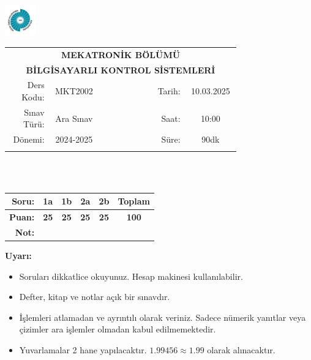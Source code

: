 \newcommand\UniversiteAdi{Niğde Ömer Halisdemir Üniversitesi}
\newcommand\BolumAdi{MEKATRONİK BÖLÜMÜ}
\newcommand\DersKodu{MKT2002}
\newcommand\DersAdi{BİLGİSAYARLI KONTROL SİSTEMLERİ}
\newcommand\SinavAdi{Ara Sınav}
\newcommand\SinavTarihi{10.03.2025}
\newcommand\SinavSaati{10:00}
\newcommand\SinavSuresi{90dk}

\pagestyle{fancy}
\fancyhf{} %
\noindent \includegraphics[width=0.1\textwidth]{logo}
\begin{tabular}{
    p{0.15\linewidth}
    p{0.15\linewidth}
    p{0.2\linewidth}
    p{0.1\linewidth}
    p{0.15\linewidth}}
    \multicolumn{5}{c}{\textbf{\BolumAdi}}\\
    \multicolumn{5}{c}{\textbf{\DersAdi}}\\\hline
    \multicolumn{1}{|r|}{Ders Kodu:}&
    \multicolumn{1}{|c|}{\DersKodu}&
    \multicolumn{1}{|c|}{}& 
    \multicolumn{1}{|r|}{Tarih:}&
    \multicolumn{1}{|c|}{\SinavTarihi} \\\hline
    \multicolumn{1}{|r|}{Sınav Türü:}&
    \multicolumn{1}{|c|}{\SinavAdi}&  
    \multicolumn{1}{|c|}{}&
    \multicolumn{1}{|r|}{Saat:}&
    \multicolumn{1}{|c|}{\SinavSaati}\\\hline
    \multicolumn{1}{|r|}{Dönemi:}&
    \multicolumn{1}{|c|}{2024-2025}&
    \multicolumn{1}{|c|}{}&
    \multicolumn{1}{|r|}{Süre:}&
    \multicolumn{1}{|c|}{\SinavSuresi} \\\hline
    &&&&\\
\end{tabular}\\\\
\noindent\begin{center}
\begin{tabular}{|r|c|c|c|c|c|}\hline
    \textbf{Soru:}&
    \textbf{1a}&
    \textbf{1b}&
    \textbf{2a}&
    \textbf{2b}&
    \textbf{Toplam}\\\hline
    \textbf{Puan:}&
    \textbf{25}&
    \textbf{25}&
    \textbf{25}&
    \textbf{25}&
    \textbf{100}\\\hline
    \textbf{Not:}&&&&&\\\hline
\end{tabular}\end{center}
\noindent\textbf{Uyarı:}
\begin{itemize}\bfseries
    \item Soruları dikkatlice okuyunuz. Hesap makinesi kullanılabilir.
    \item Defter, kitap ve notlar açık bir sınavdır.
    \item İşlemleri atlamadan ve ayrıntılı olarak veriniz. Sadece nümerik yanıtlar veya çizimler ara işlemler olmadan kabul edilmemektedir.
    \item Yuvarlamalar 2 hane yapılacaktır. $\mathbf{1.99456\approx1.99}$ olarak alınacaktır.
\end{itemize}

